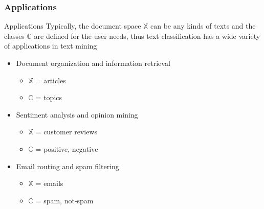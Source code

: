 \subsubsection{Applications}
\begin{frame}{Applications}
Typically, the document space $\mathbb{X}$ can be any kinds of texts and the classes $\mathbb{C}$ are defined for the user needs, thus text classification has a wide variety of applications in text mining
\begin{itemize}
\item Document organization and information retrieval
	\begin{itemize}
	\item $\mathbb{X}$ = articles
	\item $\mathbb{C}$ = topics
	\end{itemize}
\item Sentiment analysis and opinion mining
	\begin{itemize}
	\item $\mathbb{X}$ = customer reviews
	\item $\mathbb{C}$ = positive, negative
	\end{itemize}
\item Email routing and spam filtering
	\begin{itemize}
	\item $\mathbb{X}$ = emails
	\item $\mathbb{C}$ = spam, not-spam
	\end{itemize}
\end{itemize}
\end{frame}